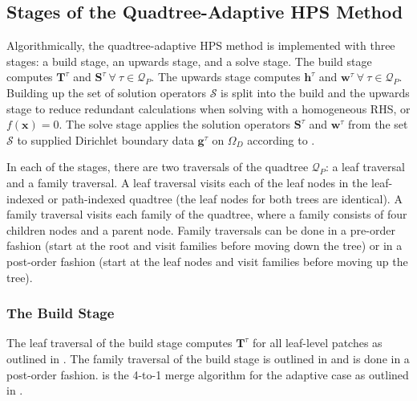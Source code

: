 \subsection{Stages of the Quadtree-Adaptive HPS Method}
\label{sub:stages-of-the-quadtree-adaptive-hps-method}

Algorithmically, the quadtree-adaptive HPS method is implemented with three stages: a build stage, an upwards stage, and a solve stage. The build stage computes $\textbf{T}^{\tau}$ and $\textbf{S}^{\tau}\ \forall\ \tau \in \mathcal{Q}_P$. The upwards stage computes $\textbf{h}^{\tau}$ and $\textbf{w}^{\tau}\ \forall\ \tau \in \mathcal{Q}_P$. Building up the set of solution operators $\mathcal{S}$ is split into the build and the upwards stage to reduce redundant calculations when solving  with a homogeneous RHS, or $f(\textbf{x}) = 0$. The solve stage applies the solution operators $\textbf{S}^{\tau}$ and $\textbf{w}^{\tau}$ from the set $\mathcal{S}$ to supplied  Dirichlet boundary data $\textbf{g}^{\tau}$ on $\Omega_D$  according to .

In each of the stages, there are two traversals of the quadtree $\mathcal{Q}_P$: a leaf traversal and a family traversal. A leaf traversal visits each of the leaf nodes in the leaf-indexed or path-indexed quadtree (the leaf nodes for both trees are identical). A family traversal visits each family of the quadtree, where a family consists of four children nodes and a parent node. Family traversals can be done in a pre-order fashion (start at the root and visit families before moving down the tree) or in a post-order fashion (start at the leaf nodes and visit families before moving up the tree).

\subsubsection{The Build Stage}

The leaf traversal of the build stage computes $\textbf{T}^{\tau}$ for all leaf-level patches as outlined in . The family traversal of the build stage is outlined in  and is done in a post-order fashion.  is the 4-to-1 merge algorithm for the adaptive case as outlined in .

